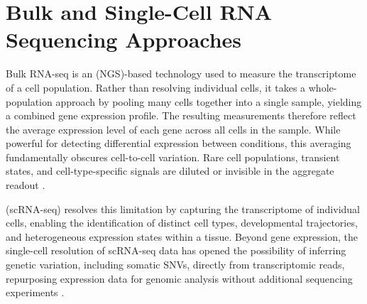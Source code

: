 


\section{Bulk and Single-Cell RNA Sequencing Approaches}



Bulk RNA-seq is an  (NGS)-based technology used to measure the transcriptome of a cell population. Rather than resolving individual cells, it takes a whole-population approach by pooling many cells together into a single sample, yielding a combined gene expression profile. The resulting measurements therefore reflect the average expression level of each gene across all cells in the sample. 
While powerful for detecting differential expression between conditions, this averaging fundamentally obscures cell-to-cell variation. Rare cell populations, transient states, and cell-type-specific signals are diluted or invisible in the aggregate readout \parencite{LiExploringAdditional2020, Libulksinglecell2021}.

 (scRNA-seq) resolves this limitation by capturing the transcriptome of individual cells, enabling the identification of distinct cell types, developmental trajectories, and heterogeneous expression states within a tissue. 
Beyond gene expression, the single-cell resolution of scRNA-seq data has opened the possibility of inferring genetic variation, including somatic SNVs, directly from transcriptomic reads, repurposing expression data for genomic analysis without additional sequencing experiments \parencite{LiuSystematiccomparative2019, LiExploringAdditional2020}.

